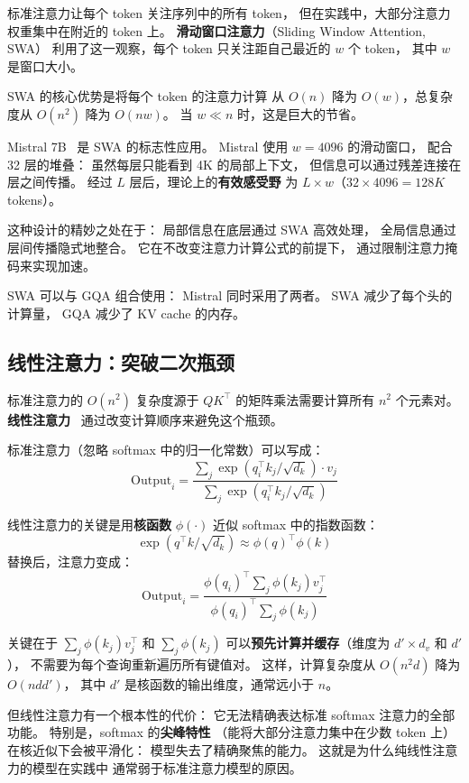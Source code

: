 标准注意力让每个 token 关注序列中的所有 token，
但在实践中，大部分注意力权重集中在附近的 token 上。
\textbf{滑动窗口注意力}（Sliding Window Attention, SWA）
利用了这一观察，每个 token 只关注距自己最近的 $w$ 个 token，
其中 $w$ 是窗口大小。

SWA 的核心优势是将每个 token 的注意力计算
从 $O(n)$ 降为 $O(w)$，总复杂度从 $O(n^2)$ 降为 $O(nw)$。
当 $w \ll n$ 时，这是巨大的节省。

Mistral 7B~\cite{jiang2023mistral} 是 SWA 的标志性应用。
Mistral 使用 $w = 4096$ 的滑动窗口，
配合 32 层的堆叠：
虽然每层只能看到 4K 的局部上下文，
但信息可以通过残差连接在层之间传播。
经过 $L$ 层后，理论上的\textbf{有效感受野}
为 $L \times w$（$32 \times 4096 = 128K$ tokens）。

这种设计的精妙之处在于：
局部信息在底层通过 SWA 高效处理，
全局信息通过层间传播隐式地整合。
它在不改变注意力计算公式的前提下，
通过限制注意力掩码来实现加速。

SWA 可以与 GQA 组合使用：
Mistral 同时采用了两者。
SWA 减少了每个头的计算量，
GQA 减少了 KV cache 的内存。

\subsection{线性注意力：突破二次瓶颈}

标准注意力的 $O(n^2)$ 复杂度源于
$QK^\top$ 的矩阵乘法需要计算所有 $n^2$ 个元素对。
\textbf{线性注意力}~\cite{katharopoulos2020linear}
通过改变计算顺序来避免这个瓶颈。

标准注意力（忽略 softmax 中的归一化常数）可以写成：
\[
  \mathrm{Output}_i = \frac{\sum_j \exp(q_i^\top k_j / \sqrt{d_k}) \cdot v_j}
                           {\sum_j \exp(q_i^\top k_j / \sqrt{d_k})}
\]

线性注意力的关键是用\textbf{核函数}
$\phi(\cdot)$ 近似 softmax 中的指数函数：
\[
  \exp(q^\top k / \sqrt{d_k}) \approx \phi(q)^\top \phi(k)
\]
替换后，注意力变成：
\[
  \mathrm{Output}_i = \frac{\phi(q_i)^\top \sum_j \phi(k_j) v_j^\top}
                           {\phi(q_i)^\top \sum_j \phi(k_j)}
\]

关键在于 $\sum_j \phi(k_j) v_j^\top$ 和 $\sum_j \phi(k_j)$
可以\textbf{预先计算并缓存}（维度为 $d' \times d_v$ 和 $d'$），
不需要为每个查询重新遍历所有键值对。
这样，计算复杂度从 $O(n^2 d)$ 降为 $O(n d d')$，
其中 $d'$ 是核函数的输出维度，通常远小于 $n$。

但线性注意力有一个根本性的代价：
它无法精确表达标准 softmax 注意力的全部功能。
特别是，softmax 的\textbf{尖峰特性}
（能将大部分注意力集中在少数 token 上）
在核近似下会被平滑化：
模型失去了精确聚焦的能力。
这就是为什么纯线性注意力的模型在实践中
通常弱于标准注意力模型的原因。

